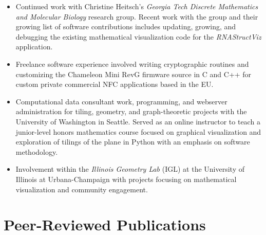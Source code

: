 \documentclass[10pt,letterpaper,sans]{moderncv}        %
\begin{document}
\begin{itemize} 
     \setlength{\itemsep}{1mm} 

\item[] 
     {\small 
        Continued work with Christine Heitsch's 
        \textit{Georgia Tech Discrete Mathematics and Molecular Biology} 
        research group. Recent work with the group and their growing list of 
        software contributions includes updating, growing, and debugging the 
        existing mathematical visualization code for the \textit{RNAStructViz} 
        application. 
     }  
     
\item[] 
     {\small 
        Freelance software experience involved writing 
        cryptographic routines and customizing the 
        Chameleon Mini RevG firmware source in C and C++ for custom private 
        commercial NFC applications based in the EU.
     }  

\item[] 
     {\small 
        Computational data consultant work, programming, and webserver administration for 
        tiling, geometry, and graph-theoretic projects with the University of Washington in Seattle. 
        Served as an online instructor to teach a junior-level honors mathematics course focused on 
        graphical visualization and exploration of tilings of the plane in Python with an emphasis on 
        software methodology. 
     }  

\item[] 
     {\small 
        Involvement within the \emph{Illinois Geometry Lab} (IGL) 
        at the University of Illinois at Urbana-Champaign 
        with projects focusing on mathematical visualization and community engagement. 
     }   

\end{itemize} 

\section{Peer-Reviewed Publications}
\end{document}
